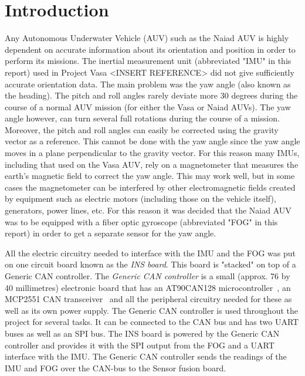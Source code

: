 \section{Introduction}\label{sec:introduction}
Any Autonomous Underwater Vehicle (AUV) such as the Naiad AUV is highly dependent on accurate information about its orientation and position in order to perform its missions. The inertial measurement unit (abbreviated "IMU" in this report) used in Project Vasa <INSERT REFERENCE> did not give sufficiently accurate orientation data. The main problem was the yaw angle (also known as the heading). \newline
The pitch and roll angles rarely deviate more 30 degrees during the course of a normal AUV mission (for either the Vasa or Naiad AUVs). The yaw angle however, can turn several full rotations during the course of a mission. Moreover, the pitch and roll angles can easily be corrected using the gravity vector as a reference. This cannot be done with the yaw angle since the yaw angle moves in a plane perpendicular to the gravity vector. \newline
For this reason many IMUs, including that used on the Vasa AUV, rely on a magnetometer that measures the earth's magnetic field to correct the yaw angle. This may work well, but in some cases the magnetometer can be interfered by other electromagnetic fields created by equipment such as electric motors (including those on the vehicle itself), generators, power lines, etc. For this reason it was decided that the Naiad AUV was to be equipped with a fiber optic gyroscope (abbreviated "FOG" in this report) in order to get a separate sensor for the yaw angle.

All the electric circuitry needed to interface with the IMU and the FOG was put on one circuit board known as the \emph{INS board}. This board is "stacked" on top of a Generic CAN controller. The \emph{Generic CAN controller} is a small (approx. 76 by 40 millimetres) electronic board that has an AT90CAN128 microcontroller~\cite{web:at90can}, an MCP2551 CAN transceiver~\cite{web:mcp2551} and all the peripheral circuitry needed for these as well as its own power supply. The Generic CAN controller is used throughout the project for several tasks. It can be connected to the CAN bus and has two UART buses as well as an SPI bus. \newline
The INS board is powered by the Generic CAN controller and provides it with the SPI output from the FOG and a UART interface with the IMU. The Generic CAN controller sends the readings of the IMU and FOG over the CAN-bus to the Sensor fusion board.
